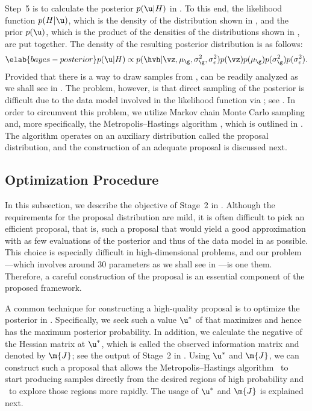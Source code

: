 Step~5 is to calculate the posterior $p(\u | H)$ in . To
this end, the likelihood function $p(H | \u)$, which is the density of the
distribution shown in , and the prior $p(\u)$, which is
the product of the densities of the distributions shown in ,
are put together. The density of the resulting posterior distribution is as
follows:
\begin{equation} \elab{bayes-posterior}
  p(\u | H) \propto p(\hvh | \vz, \mu_\g, \sigma^2_\g, \sigma^2_\epsilon) p(\vz) p(\mu_\g) p(\sigma^2_\g) p(\sigma^2_\epsilon).
\end{equation}
Provided that there is a way to draw samples from , \g can
be readily analyzed as we shall see in . The problem,
however, is that direct sampling of the posterior is difficult due to the data
model involved in the likelihood function via \vh; see .
In order to circumvent this problem, we utilize Markov chain Monte Carlo
sampling and, more specifically, the Metropolis--Hastings algorithm
\cite{gelman2013}, which is outlined in . The
algorithm operates on an auxiliary distribution called the proposal
distribution, and the construction of an adequate proposal is discussed next.

\subsection{Optimization Procedure}

In this subsection, we describe the objective of Stage~2 in
. Although the requirements for the proposal distribution
are mild, it is often difficult to pick an efficient proposal, that is, such a
proposal that would yield a good approximation with as few evaluations of the
posterior and thus of the data model in  as possible.
This choice is especially difficult in high-dimensional problems, and our
problem---which involves around 30 parameters as we shall see in
---is one them. Therefore, a careful construction of the
proposal is an essential component of the proposed framework.

A common technique for constructing a high-quality proposal is to optimize the
posterior in . Specifically, we seek such a value $\u^*$
of \u that maximizes  and hence has the maximum posterior
probability. In addition, we calculate the negative of the Hessian matrix at
$\u^*$, which is called the observed information matrix and denoted by $\m{J}$;
see the output of Stage~2 in . Using $\u^*$ and $\m{J}$, we
can construct such a proposal that allows the Metropolis--Hastings algorithm
\one~to start producing samples directly from the desired regions of high
probability and \two~to explore those regions more rapidly. The usage of $\u^*$
and $\m{J}$ is explained next.

